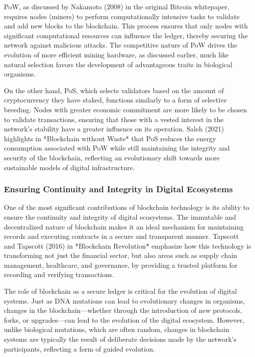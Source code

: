 \documentclass[12pt,twoside]{article}
\begin{document}
PoW, as discussed by Nakamoto (2008) in the original Bitcoin whitepaper, requires nodes (miners) to perform computationally intensive tasks to validate and add new blocks to the blockchain. This process ensures that only nodes with significant computational resources can influence the ledger, thereby securing the network against malicious attacks. The competitive nature of PoW drives the evolution of more efficient mining hardware, as discussed earlier, much like natural selection favors the development of advantageous traits in biological organisms.

On the other hand, PoS, which selects validators based on the amount of cryptocurrency they have staked, functions similarly to a form of selective breeding. Nodes with greater economic commitment are more likely to be chosen to validate transactions, ensuring that those with a vested interest in the network’s stability have a greater influence on its operation. Saleh (2021) highlights in *Blockchain without Waste* that PoS reduces the energy consumption associated with PoW while still maintaining the integrity and security of the blockchain, reflecting an evolutionary shift towards more sustainable models of digital infrastructure.

\subsubsection{Ensuring Continuity and Integrity in Digital Ecosystems}

One of the most significant contributions of blockchain technology is its ability to ensure the continuity and integrity of digital ecosystems. The immutable and decentralized nature of blockchain makes it an ideal mechanism for maintaining records and executing contracts in a secure and transparent manner. Tapscott and Tapscott (2016) in *Blockchain Revolution* emphasize how this technology is transforming not just the financial sector, but also areas such as supply chain management, healthcare, and governance, by providing a trusted platform for recording and verifying transactions.

The role of blockchain as a secure ledger is critical for the evolution of digital systems. Just as DNA mutations can lead to evolutionary changes in organisms, changes in the blockchain—whether through the introduction of new protocols, forks, or upgrades—can lead to the evolution of the digital ecosystem. However, unlike biological mutations, which are often random, changes in blockchain systems are typically the result of deliberate decisions made by the network’s participants, reflecting a form of guided evolution.
\end{document}
